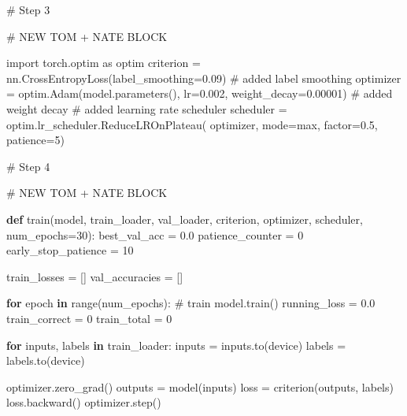 \documentclass[
  letterpaper,
  DIV=11,
  numbers=noendperiod]{scrartcl}
\newenvironment{Shaded}{\begin{snugshade}}{\end{snugshade}}
\newcommand{\BuiltInTok}[1]{\textcolor[rgb]{0.00,0.23,0.31}{#1}}
\newcommand{\CommentTok}[1]{\textcolor[rgb]{0.37,0.37,0.37}{#1}}
\newcommand{\ControlFlowTok}[1]{\textcolor[rgb]{0.00,0.23,0.31}{\textbf{#1}}}
\newcommand{\DecValTok}[1]{\textcolor[rgb]{0.68,0.00,0.00}{#1}}
\newcommand{\FloatTok}[1]{\textcolor[rgb]{0.68,0.00,0.00}{#1}}
\newcommand{\ImportTok}[1]{\textcolor[rgb]{0.00,0.46,0.62}{#1}}
\newcommand{\KeywordTok}[1]{\textcolor[rgb]{0.00,0.23,0.31}{\textbf{#1}}}
\newcommand{\NormalTok}[1]{\textcolor[rgb]{0.00,0.23,0.31}{#1}}
\newcommand{\OperatorTok}[1]{\textcolor[rgb]{0.37,0.37,0.37}{#1}}
\newcommand{\StringTok}[1]{\textcolor[rgb]{0.13,0.47,0.30}{#1}}
\begin{document}
\begin{Shaded}
\begin{Highlighting}[]
\CommentTok{\# Step 3}

\CommentTok{\# NEW TOM + NATE BLOCK}

\ImportTok{import}\NormalTok{ torch.optim }\ImportTok{as}\NormalTok{ optim}
\NormalTok{criterion }\OperatorTok{=}\NormalTok{ nn.CrossEntropyLoss(label\_smoothing}\OperatorTok{=}\FloatTok{0.09}\NormalTok{) }\CommentTok{\# added label smoothing}
\NormalTok{optimizer }\OperatorTok{=}\NormalTok{ optim.Adam(model.parameters(), lr}\OperatorTok{=}\FloatTok{0.002}\NormalTok{, weight\_decay}\OperatorTok{=}\FloatTok{0.00001}\NormalTok{) }\CommentTok{\# added weight decay}
\CommentTok{\# added learning rate scheduler}
\NormalTok{scheduler }\OperatorTok{=}\NormalTok{ optim.lr\_scheduler.ReduceLROnPlateau(}
\NormalTok{    optimizer,}
\NormalTok{    mode}\OperatorTok{=}\StringTok{\textquotesingle{}max\textquotesingle{}}\NormalTok{,}
\NormalTok{    factor}\OperatorTok{=}\FloatTok{0.5}\NormalTok{,}
\NormalTok{    patience}\OperatorTok{=}\DecValTok{5}\NormalTok{)}

\CommentTok{\# Step 4}

\CommentTok{\# NEW TOM + NATE BLOCK}

\KeywordTok{def}\NormalTok{ train(model, train\_loader, val\_loader, criterion, optimizer, scheduler, num\_epochs}\OperatorTok{=}\DecValTok{30}\NormalTok{):}
\NormalTok{    best\_val\_acc }\OperatorTok{=} \FloatTok{0.0}
\NormalTok{    patience\_counter }\OperatorTok{=} \DecValTok{0}
\NormalTok{    early\_stop\_patience }\OperatorTok{=} \DecValTok{10}

\NormalTok{    train\_losses }\OperatorTok{=}\NormalTok{ []}
\NormalTok{    val\_accuracies }\OperatorTok{=}\NormalTok{ []}

    \ControlFlowTok{for}\NormalTok{ epoch }\KeywordTok{in} \BuiltInTok{range}\NormalTok{(num\_epochs):}
        \CommentTok{\# train}
\NormalTok{        model.train()}
\NormalTok{        running\_loss }\OperatorTok{=} \FloatTok{0.0}
\NormalTok{        train\_correct }\OperatorTok{=} \DecValTok{0}
\NormalTok{        train\_total }\OperatorTok{=} \DecValTok{0}

        \ControlFlowTok{for}\NormalTok{ inputs, labels }\KeywordTok{in}\NormalTok{ train\_loader:}
\NormalTok{            inputs }\OperatorTok{=}\NormalTok{ inputs.to(device)}
\NormalTok{            labels }\OperatorTok{=}\NormalTok{ labels.to(device)}

\NormalTok{            optimizer.zero\_grad()}
\NormalTok{            outputs }\OperatorTok{=}\NormalTok{ model(inputs)}
\NormalTok{            loss }\OperatorTok{=}\NormalTok{ criterion(outputs, labels)}
\NormalTok{            loss.backward()}
\NormalTok{            optimizer.step()}


\end{Highlighting}
\end{Shaded}
\end{document}
